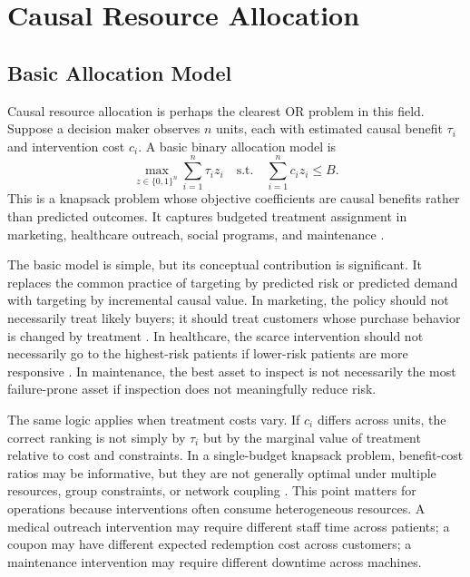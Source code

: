 \documentclass[11pt]{article}
\begin{document}
\section{Causal Resource Allocation}
\label{sec:allocation}

\subsection{Basic Allocation Model}

Causal resource allocation is perhaps the clearest OR problem in this field. Suppose a decision maker observes $n$ units, each with estimated causal benefit $\tau_i$ and intervention cost $c_i$. A basic binary allocation model is
\[
    \max_{z\in\{0,1\}^n} \sum_{i=1}^{n}\tau_i z_i
    \quad
    \text{s.t.}\quad
    \sum_{i=1}^{n}c_i z_i \le B.
\]
This is a knapsack problem whose objective coefficients are causal benefits rather than predicted outcomes. It captures budgeted treatment assignment in marketing, healthcare outreach, social programs, and maintenance \citep{kitagawa2018treated,athey2021policy,fernandez2022causal}.

The basic model is simple, but its conceptual contribution is significant. It replaces the common practice of targeting by predicted risk or predicted demand with targeting by incremental causal value. In marketing, the policy should not necessarily treat likely buyers; it should treat customers whose purchase behavior is changed by treatment \citep{fernandez2022causal}. In healthcare, the scarce intervention should not necessarily go to the highest-risk patients if lower-risk patients are more responsive \citep{murphy2003dynamic,zhang2012robust}. In maintenance, the best asset to inspect is not necessarily the most failure-prone asset if inspection does not meaningfully reduce risk.

The same logic applies when treatment costs vary. If $c_i$ differs across units, the correct ranking is not simply by $\tau_i$ but by the marginal value of treatment relative to cost and constraints. In a single-budget knapsack problem, benefit-cost ratios may be informative, but they are not generally optimal under multiple resources, group constraints, or network coupling \citep{bertsimas1997introduction}. This point matters for operations because interventions often consume heterogeneous resources. A medical outreach intervention may require different staff time across patients; a coupon may have different expected redemption cost across customers; a maintenance intervention may require different downtime across machines.
\end{document}
